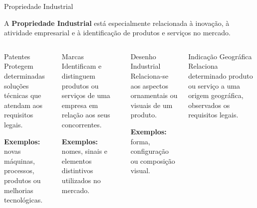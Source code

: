 \documentclass[9pt]{beamer}
\begin{document}
\begin{frame}{Propriedade Industrial}

  \begin{center}
    \small
    A \textbf{Propriedade Industrial} está especialmente relacionada
    à inovação, à atividade empresarial e à identificação de produtos
    e serviços no mercado.
  \end{center}

  \vspace{0.1cm}

  \begin{columns}[T]


    \begin{block}{Patentes}
      \small
      Protegem determinadas soluções técnicas que atendam
      aos requisitos legais.

      \vspace{0.1cm}

      \textbf{Exemplos:}
      novas máquinas, processos, produtos ou melhorias
      tecnológicas.
    \end{block}

    \begin{block}{Marcas}
      \small
      Identificam e distinguem produtos ou serviços
      de uma empresa em relação aos seus concorrentes.

      \vspace{0.1cm}

      \textbf{Exemplos:}
      nomes, sinais e elementos distintivos utilizados
      no mercado.
    \end{block}


    \begin{block}{Desenho Industrial}
      \small
      Relaciona-se aos aspectos ornamentais ou visuais
      de um produto.

      \vspace{0.1cm}

      \textbf{Exemplos:}
      forma, configuração ou composição visual.
    \end{block}

    \begin{block}{Indicação Geográfica}
      \small
      Relaciona determinado produto ou serviço a uma
      origem geográfica, observados os requisitos legais.


\end{block}
\end{columns}
\end{frame}
\end{document}
